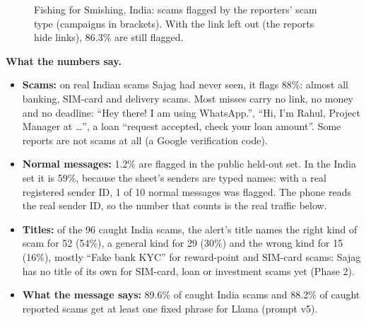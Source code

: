 \documentclass[11pt,a4paper]{article}
\begin{document}
\begin{figure}[H]
\centering
{}
\caption{Fishing for Smishing, India: scams flagged by the reporters' scam type (campaigns in brackets). With the link
left out (the reports hide links), 86.3\% are still flagged.}
\label{fig:bytype}
\end{figure}

\textbf{What the numbers say.}
\begin{itemize}
  \item \textbf{Scams:} on real Indian scams Sajag had never seen, it flags 88\%: almost all banking, SIM-card and delivery
        scams. Most misses carry no link, no money and no deadline: ``Hey there! I am using WhatsApp.'', ``Hi, I'm Rahul,
        Project Manager at \dots'', a loan ``request accepted, check your loan amount''. Some reports are not scams at all
        (a Google verification code).
  \item \textbf{Normal messages:} 1.2\% are flagged in the public held-out set. In the India set it is 59\%, because the
        sheet's senders are typed names: with a real registered sender ID, 1 of 10 normal messages was flagged. The phone
        reads the real sender ID, so the number that counts is the real traffic below.
  \item \textbf{Titles:} of the 96 caught India scams, the alert's title names the right kind of scam for 52 (54\%), a
        general kind for 29 (30\%) and the wrong kind for 15 (16\%), mostly ``Fake bank KYC'' for reward-point and
        SIM-card scams: Sajag has no title of its own for SIM-card, loan or investment scams yet (Phase 2).
  \item \textbf{What the message says:} 89.6\% of caught India scams and 88.2\% of caught reported scams get at least one
        fixed phrase for Llama (prompt v5).
\end{itemize}
\end{document}
